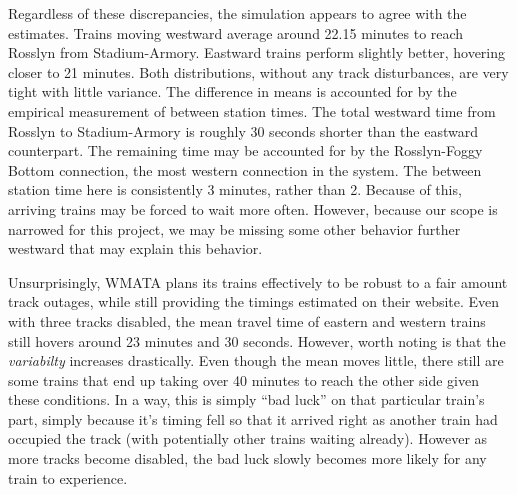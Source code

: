 \documentclass[a4paper,12pt]{article}
\begin{document}
Regardless of these discrepancies, the simulation appears to agree with the estimates. Trains moving westward average
around 22.15 minutes to reach Rosslyn from Stadium-Armory. Eastward trains perform slightly better, hovering closer to
21 minutes. Both distributions, without any track disturbances, are very tight with little variance. The difference in
means is accounted for by the empirical measurement of between station times. The total westward time from Rosslyn to
Stadium-Armory is roughly 30 seconds shorter than the eastward counterpart. The remaining time may be accounted for by
the Rosslyn-Foggy Bottom connection, the most western connection in the system. The between station time here is 
consistently 3 minutes, rather than 2. Because of this, arriving trains may be forced to wait more often. However,
because our scope is narrowed for this project, we may be missing some other behavior further westward that may explain
this behavior.

Unsurprisingly, WMATA plans its trains effectively to be robust to a fair amount track outages, while still providing
the timings estimated on their website. Even with three tracks disabled, the mean travel time of eastern and western
trains still hovers around 23 minutes and 30 seconds. However, worth noting is that the \emph{variabilty} increases
drastically. Even though the mean moves little, there still are some trains that end up taking over 40 minutes to
reach the other side given these conditions. In a way, this is simply ``bad luck'' on that particular train's part,
simply because it's timing fell so that it arrived right as another train had occupied the track (with potentially
other trains waiting already). However as more tracks become disabled, the bad luck slowly becomes more likely for any
train to experience.





\end{document}
